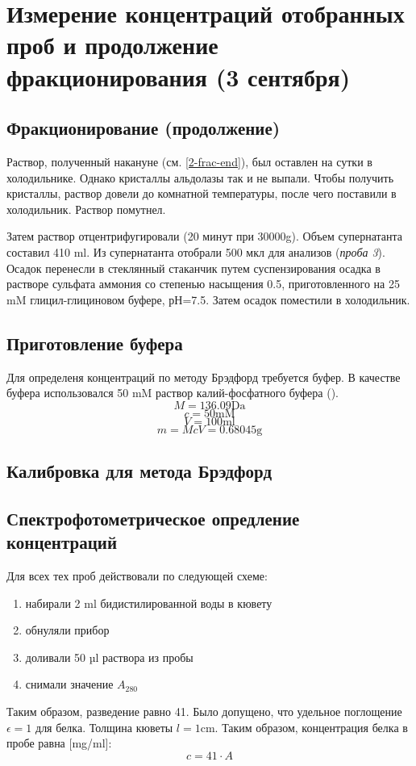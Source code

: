 \section{Измерение концентраций отобранных проб и продолжение фракционирования (3 сентября)}

\subsection{Фракционирование (продолжение)}
Раствор, полученный накануне (см. \ref{2-frac-end}), был оставлен на сутки в холодильнике.
Однако кристаллы альдолазы так и не выпали.
Чтобы получить кристаллы, раствор довели до комнатной температуры,
после чего поставили в холодильник. Раствор помутнел.

Затем раствор отцентрифугировали (20 минут при 30000g).
Объем супернатанта составил 410 ml.
Из супернатанта отобрали 500 мкл для анализов (\emph{проба 3}).
Осадок перенесли в стеклянный стаканчик путем суспензирования осадка
в растворе сульфата аммония со степенью насыщения 0.5,
приготовленного на 25 mM глицил-глициновом буфере, рН=7.5.
Затем осадок поместили в холодильник.

\subsection{Приготовление буфера}
Для определеня концентраций по методу Брэдфорд требуется буфер.
В качестве буфера использовался 50 mM раствор калий-фосфатного буфера ().
$$ M = 136.09 \text{Da} $$
$$ c = 50 \text{mM} $$
$$ V = 100 \text{ml} $$
$$ m = McV = 0.68045 \text{g} $$

\subsection{Калибровка для метода Брэдфорд}



\subsection{Спектрофотометрическое опредление концентраций}
Для всех тех проб действовали по следующей схеме:
\begin{enumerate}
\item набирали 2 ml бидистилированной воды в кювету
\item обнуляли прибор
\item доливали 50 µl раствора из пробы
\item снимали значение $A_{280}$
\end{enumerate}
Таким образом, разведение равно 41.
Было допущено, что удельное поглощение $\epsilon = 1$ для белка.
Толщина кюветы $l = 1 \text{cm}$.
Таким образом, концентрация белка в пробе равна [mg/ml]:
$$ c=41 \cdot A $$

